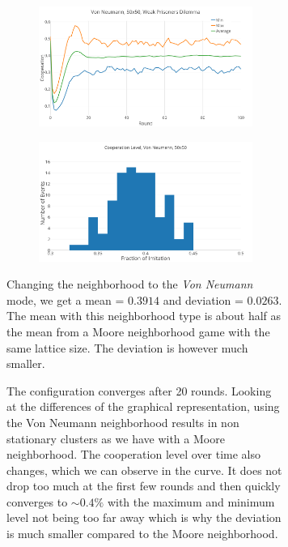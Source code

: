 \documentclass[a4paper, 11pt]{article}
\begin{document}
\begin{figure}[H]
\begin{subfigure}{.55\textwidth}
	\begin{subfigure}{1\textwidth}
		\includegraphics[width=1\linewidth]{PDVonNeumann50x50}
	\end{subfigure}

	\begin{subfigure}{1\textwidth}
		\includegraphics[width=1\linewidth]{PDVonNeumann50x50HG}
	\end{subfigure}
\end{subfigure}%
\begin{subfigure}{.45\textwidth}
	Changing the neighborhood to the \textit{Von Neumann} mode, we get a mean = $0.3914$ and deviation = $0.0263$. The mean with this neighborhood type is about half as the mean from a Moore neighborhood game with the same lattice size. The deviation is however much smaller.
	
	The configuration converges after 20 rounds. Looking at the differences of the graphical representation, using the Von Neumann neighborhood results in non stationary clusters as we have with a Moore neighborhood. The cooperation level over time also changes, which we can observe in the curve. It does not drop too much at the first few rounds and then quickly converges to $\sim 0.4\%$ with the maximum and minimum level not being too far away which is why the deviation is much smaller compared to the Moore neighborhood.
\end{subfigure}

\end{figure}
\end{document}
